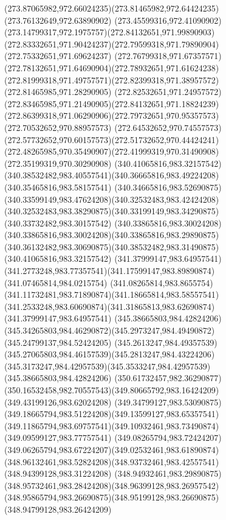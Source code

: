 {{  \curveto(273.87065982,972.66024235)(273.81465982,972.64424235)(273.76132649,972.63890902)
  \curveto(273.45599316,972.41090902)(273.14799317,972.1975757)(272.84132651,971.99890903)
  \curveto(272.83332651,971.90424237)(272.79599318,971.79890904)(272.75332651,971.69624237)
  \curveto(272.76799318,971.67357571)(272.78132651,971.64690904)(272.78932651,971.61624238)
  \curveto(272.81999318,971.49757571)(272.82399318,971.38957572)(272.81465985,971.28290905)
  \curveto(272.82532651,971.24957572)(272.83465985,971.21490905)(272.84132651,971.18824239)
  \curveto(272.86399318,971.06290906)(272.79732651,970.95357573)(272.70532652,970.88957573)
  \curveto(272.64532652,970.74557573)(272.57732652,970.60157573)(272.51732652,970.44424241)
  \curveto(272.48265985,970.35490907)(272.41999319,970.31490908)(272.35199319,970.30290908)
  \moveto(340.41065816,983.32157542)
  \curveto(340.38532482,983.40557541)(340.36665816,983.49224208)(340.35465816,983.58157541)
  \curveto(340.34665816,983.52690875)(340.33599149,983.47624208)(340.32532483,983.42424208)
  \curveto(340.32532483,983.38290875)(340.33199149,983.34290875)(340.33732482,983.30157542)
  \curveto(340.33865816,983.30024208)(340.33865816,983.30024208)(340.33865816,983.29890875)
  \curveto(340.36132482,983.30690875)(340.38532482,983.31490875)(340.41065816,983.32157542)
  \moveto(341.37999147,983.64957541)
  \curveto(341.2773248,983.77357541)(341.17599147,983.89890874)(341.07465814,984.0215754)
  \curveto(341.08265814,983.8655754)(341.11732481,983.71890874)(341.18665814,983.58557541)
  \curveto(341.2533248,983.60690874)(341.31865813,983.62690874)(341.37999147,983.64957541)
  \moveto(345.38665803,984.42824206)
  \curveto(345.34265803,984.46290872)(345.2973247,984.49490872)(345.24799137,984.52424205)
  \curveto(345.2613247,984.49357539)(345.27065803,984.46157539)(345.2813247,984.43224206)
  \curveto(345.3173247,984.42957539)(345.3533247,984.42957539)(345.38665803,984.42824206)
  \moveto(350.61732457,982.36290877)
  \curveto(350.16532458,982.70557543)(349.80665792,983.16424209)(349.43199126,983.62024208)
  \curveto(349.34799127,983.53090875)(349.18665794,983.51224208)(349.13599127,983.65357541)
  \curveto(349.11865794,983.69757541)(349.10932461,983.73490874)(349.09599127,983.77757541)
  \curveto(349.08265794,983.72424207)(349.06265794,983.67224207)(349.02532461,983.61890874)
  \curveto(348.96132461,983.52824208)(348.93732461,983.42557541)(348.94399128,983.31224208)
  \curveto(348.94932461,983.29890875)(348.95732461,983.28424208)(348.96399128,983.26957542)
  \curveto(348.95865794,983.26690875)(348.95199128,983.26690875)(348.94799128,983.26424209)
}}
